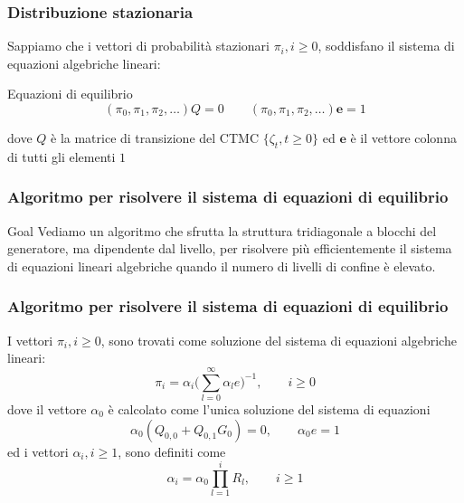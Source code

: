 \documentclass{beamer}
\begin{document}
\begin{frame}
    \frametitle{Distribuzione stazionaria}
    Sappiamo che i vettori di probabilità stazionari $\pi_i, i \geq 0$, soddisfano il sistema di equazioni algebriche lineari:
    \begin{block}{Equazioni di equilibrio}
        $$(\pi_0, \pi_1, \pi_2, \dots)Q = 0 \qquad (\pi_0, \pi_1, \pi_2, \dots)\textbf{e} = 1$$
    \end{block}
    dove $Q$ è la matrice di transizione del CTMC $\{\zeta_t, t \geq 0\}$ ed $\textbf{e}$ è il vettore colonna di tutti gli elementi $1$
\end{frame}


\begin{frame}
    \frametitle{Algoritmo per risolvere il sistema di equazioni di equilibrio}
    \begin{block}{Goal}
            Vediamo un algoritmo che sfrutta la struttura tridiagonale a blocchi del generatore, ma dipendente dal livello, per risolvere più efficientemente il sistema di equazioni lineari algebriche quando il numero di livelli di confine è elevato.
    \end{block}
\end{frame}


\begin{frame}
    \frametitle{Algoritmo per risolvere il sistema di equazioni di equilibrio}
    \begin{theorem}
        I vettori $\pi_i, i \geq 0$, sono trovati come soluzione del sistema di equazioni algebriche lineari:
        \small{\begin{equation*}
            \pi_i = \alpha_i \big( \sum_{l=0}^\infty \alpha_l e \big)^{-1}, \qquad i \geq 0
        \end{equation*}}
        dove il vettore $\alpha_0$ è calcolato come l'unica soluzione del sistema di equazioni
        \small{\begin{equation*}
            \alpha_0(Q_{0,0} + Q_{0,1}G_0) = 0, \qquad \alpha_0e = 1
        \end{equation*}}
        ed i vettori $\alpha_i, i \geq 1$, sono definiti come
        \small{\begin{equation*}
            \alpha_i = \alpha_0 \prod_{l=1}^i R_l, \qquad i \geq 1
        \end{equation*}}
    \end{theorem}
\end{frame}
\end{document}
